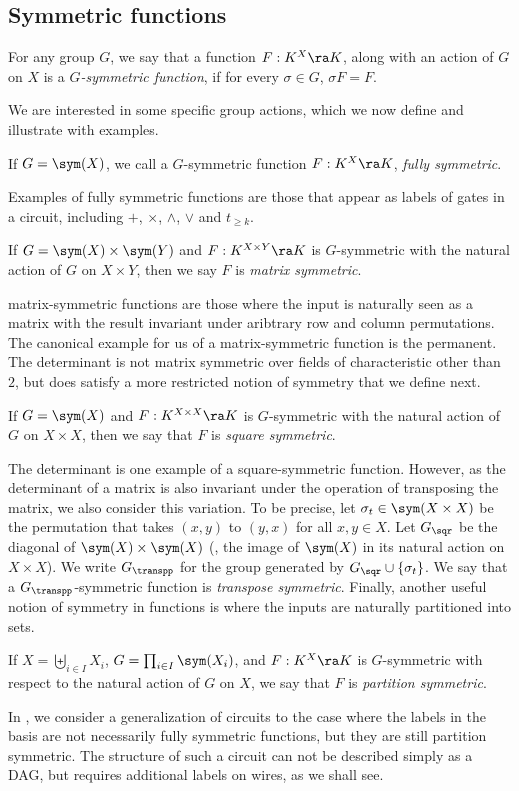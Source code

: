 \documentclass{toc}
\begin{document}
\subsection{Symmetric functions}\label{sec:symmetric-functions}
\begin{definition}
  For any group $G$, we say that a function $F: K^X \ra K$, along with an action
  of $G$ on $X$ is a \emph{$G$-symmetric function}, if for every $\sigma \in G$,
  $\sigma F = F$.
\end{definition}
We are interested in some specific group actions, which we now define and
illustrate with examples.
\begin{definition}
  \label{def:full-symm}
  If $G=\sym(X)$, we call a $G$-symmetric function $F: K^X \ra K$, \emph{fully
    symmetric}.
\end{definition}
Examples of fully symmetric functions are those that appear as labels of gates
in a circuit, including $+$, $\times$, $\land$, $\lor$ and $t_{\geq k}$.
\begin{definition}
  If $G = \sym(X) \times \sym(Y)$ and $F : K^{X \times Y} \ra K$ is
  $G$-symmetric with the natural action of $G$ on $X \times Y$, then we say $F$
  is \emph{matrix symmetric}.
\end{definition}
matrix-symmetric functions are those where the input is naturally seen as a
matrix with the result invariant under aribtrary row and column permutations.
The canonical example for us of a matrix-symmetric function is the permanent.
The determinant is not matrix symmetric over fields of characteristic other than
$2$, but does satisfy a more restricted notion of symmetry that we define next.
\begin{definition}
  If $G = \sym(X)$ and $F : K^{X \times X} \ra K$ is $G$-symmetric with the
  natural action of $G$ on $X \times X$, then we say that
  $F$ is \emph{square
    symmetric}.
\end{definition}
The determinant is one example of a square-symmetric function. However, as the
determinant of a matrix is also invariant under the operation of transposing the
matrix, we also consider this variation. To be precise, let $\sigma_t \in \sym(X
\times X)$ be the permutation that takes $(x,y)$ to $(y,x)$ for all $x,y\in X$.
Let $G_{\sqr}$ be the diagonal of $\sym(X)\times \sym(X)$ (\ie, the image of
$\sym(X)$ in its natural action on $X \times X$). We write $G_{\transpp}$ for the
group generated by $G_{\sqr} \cup \{\sigma_t\}$. We say that
%
a $G_{\transpp}$-symmetric function is \emph{transpose symmetric}.
Finally, another useful notion of symmetry in functions is where the inputs are
naturally partitioned into sets.
\begin{definition}
  If $X = \biguplus_{i \in I} X_i$, $G = \prod_{i \in I}\sym(X_i)$, and $F: K^X
  \ra K$ is $G$-symmetric with respect to the natural action of $G$ on $X$, we
  say that
  $F$ is \emph{partition symmetric}.
\end{definition}
In , we consider a generalization of
circuits to the case where the labels in the basis are not necessarily fully
symmetric functions, but they are still partition symmetric. The structure of
such a circuit can not be described simply as a DAG, but requires additional
labels on wires, as we shall see.
\end{document}
